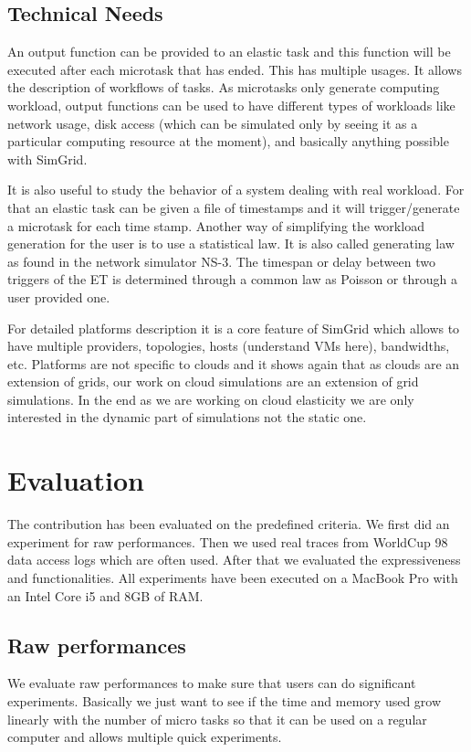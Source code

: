 \documentclass[a4paper, onecolumn, 11pt]{article}
\begin{document}
  \subsection{Technical Needs}
  An output function can be provided to an elastic task and this function will
  be executed after each microtask that has ended. This has multiple usages. It
  allows the description of workflows of tasks. As microtasks only generate
  computing workload, output functions can be used to have different types of
  workloads like network usage, disk access (which can be simulated only by
  seeing it as a particular computing resource at the moment), and basically
  anything possible with SimGrid.
  
  It is also useful to study the behavior of a system dealing with real
  workload. For that an elastic task can be given a file of timestamps and it
  will trigger/generate a microtask for each time stamp. Another way of 
  simplifying the workload generation for the user is to use a statistical law. 
  It is also called generating law as found in the network simulator NS-3. The 
  timespan or delay between two triggers of the ET is determined through a 
  common law as Poisson or through a user provided one.
  
  For detailed platforms description it is a core feature of SimGrid which
  allows to have multiple providers, topologies, hosts (understand VMs here),
  bandwidths, etc. Platforms are not specific to clouds and it shows again that
  as clouds are an extension of grids, our work on cloud simulations are an
  extension of grid simulations. In the end as we are working on cloud
  elasticity we are only interested in the dynamic part of simulations not the
  static one.


\section{Evaluation} \label{eval}
  The contribution has been evaluated on the predefined criteria. We first did 
  an experiment for raw performances. Then we used real traces from WorldCup 98 
  data access logs \cite{wc98} which are often used. After that we evaluated 
  the expressiveness and functionalities. All experiments have been executed on 
  a MacBook Pro with an Intel Core i5 and 8GB of RAM.
    
  \subsection{Raw performances} \label{raw_perf}
    We evaluate raw performances to make sure that users can do significant 
    experiments. Basically we just want to see if the time and memory used grow 
    linearly with the number of micro tasks so that it can be used on a regular 
    computer and allows multiple quick experiments.
  
\end{document}
